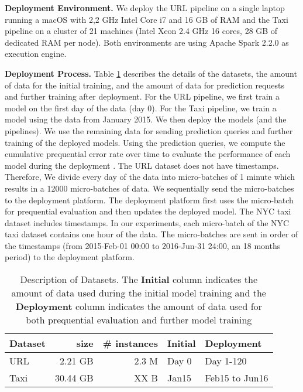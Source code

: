 \textbf{Deployment Environment. }
We deploy the URL pipeline on a single laptop running a macOS with 2,2 GHz Intel Core i7 and 16 GB of RAM and the Taxi pipeline on a cluster of 21 machines (Intel Xeon 2.4 GHz 16 cores, 28 GB of dedicated RAM per node).
Both environments are using Apache Spark 2.2.0 as execution engine.

\textbf{Deployment Process. }
Table \ref{dataset-description} describes the details of the datasets, the amount of data for the initial training, and the amount of data for prediction requests and further training after deployment. 
For the URL pipeline, we first train a model on the first day of the data (day 0).
For the Taxi pipeline, we train a model using the data from January 2015.
We then deploy the models (and the pipelines).
We use the remaining data for sending prediction queries and further training of the deployed models.
Using the prediction queries, we compute the cumulative prequential error rate over time to evaluate the performance of each model during the deployment \cite{dawid1984present}.
The URL dataset does not have timestamps. 
Therefore, We divide every day of the data into micro-batches of 1 minute which results in a 12000 micro-batches of data.
We sequentially send the micro-batches to the deployment platform.
The deployment platform first uses the micro-batch for prequential evaluation and then updates the deployed model.
The NYC taxi dataset includes timestamps. 
In our experiments, each micro-batch of the NYC taxi dataset contains one hour of the data. 
The micro-batches are sent in order of the timestamps (from 2015-Feb-01  00:00 to 2016-Jun-31 24:00, an 18 months period) to the deployment platform.

\begin{table}[h!]
\centering
\begin{tabular}{lrrll}
\hline
\textbf{Dataset}  & \textbf{size} &\textbf{\# instances} & \textbf{Initial} & \textbf{Deployment} \\
\hline
URL        &  2.21 GB 	& 2.3 M  			& Day 0        	  & Day 1-120          \\
Taxi        &  30.44 GB 	& XX B              & Jan15              & Feb15 to Jun16    \\
\hline
\end{tabular}
\caption{Description of Datasets. The \textbf{Initial} column indicates the amount of data used during the initial model training and the \textbf{Deployment} column indicates the amount of data used for both prequential evaluation and further model training}  
\label{dataset-description}
\end{table}



